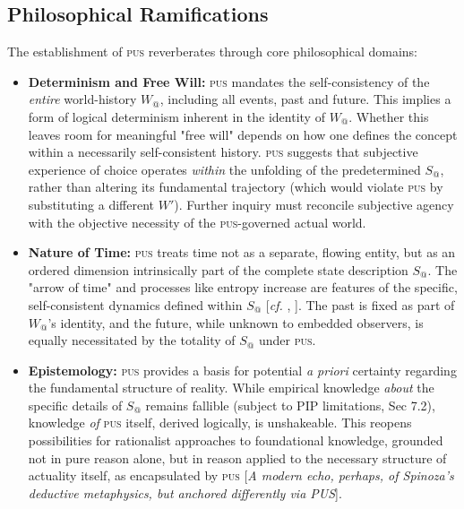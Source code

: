 \documentclass[11pt, a4paper]{article}
\makeatletter
\newcommand{\pus}{\textsc{pus}} %
\newcommand{\Wactual}{W_{@}} %
\newcommand{\Sactual}{S_{@}} %
\makeatother
\begin{document}
\subsection{Philosophical Ramifications}
The establishment of \pus{} reverberates through core philosophical domains:
\begin{itemize}
    \item \textbf{Determinism and Free Will:} \pus{} mandates the self-consistency of the \textit{entire} world-history $\Wactual$, including all events, past and future. This implies a form of logical determinism inherent in the identity of $\Wactual$. Whether this leaves room for meaningful "free will" depends on how one defines the concept within a necessarily self-consistent history. \pus{} suggests that subjective experience of choice operates \textit{within} the unfolding of the predetermined $\Sactual$, rather than altering its fundamental trajectory (which would violate \pus{} by substituting a different $W'$). Further inquiry must reconcile subjective agency with the objective necessity of the \pus-governed actual world.
    \item \textbf{Nature of Time:} \pus{} treats time not as a separate, flowing entity, but as an ordered dimension intrinsically part of the complete state description $\Sactual$. The "arrow of time" and processes like entropy increase are features of the specific, self-consistent dynamics defined within $\Sactual$ [\textit{cf.} \citealp{prigogine1984}, \citealp{price1996}]. The past is fixed as part of $\Wactual$'s identity, and the future, while unknown to embedded observers, is equally necessitated by the totality of $\Sactual$ under \pus.
    \item \textbf{Epistemology:} \pus{} provides a basis for potential \textit{a priori} certainty regarding the fundamental structure of reality. While empirical knowledge \textit{about} the specific details of $\Sactual$ remains fallible (subject to PIP limitations, Sec 7.2), knowledge \textit{of} \pus{} itself, derived logically, is unshakeable. This reopens possibilities for rationalist approaches to foundational knowledge, grounded not in pure reason alone, but in reason applied to the necessary structure of actuality itself, as encapsulated by \pus{} [\textit{A modern echo, perhaps, of Spinoza's deductive metaphysics, but anchored differently via PUS}].
\end{itemize}

\FloatBarrier

\end{document}

